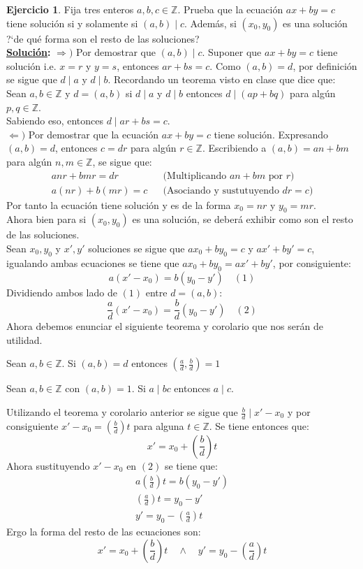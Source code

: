 \documentclass[11pt,letterpaper]{article}
\theoremstyle{definition}\newtheorem{p}{Ejercicio}
\theoremstyle{definition}\newtheorem{pp}[p]{$(*)$Ejercicio}
\numberwithin{p}{section}
\newcommand{\Z}{\mathbb{Z}}
\newcommand{\sol}{\textbf{\underline{Solución}: }} %
\begin{document}
\begin{p}
  Fija tres enteros $a,b,c\in\Z$. Prueba que la ecuaci\'on $ax+by=c$ tiene soluci\'on si y solamente si $(a,b)\mid c$.
  Adem\'as, si $(x_0,y_0)$ es una soluci\'on ?`de qu\'e forma son el resto de las soluciones?\\
  \sol $\Rightarrow )$ Por demostrar que $(a,b)\mid c$. Suponer que $ax+by=c$ tiene solución 
  i.e. $x=r$ y $y=s$, entonces $ar+bs=c$. Como $(a,b)=d$, por definición se sigue que $d \mid a$ y
  $d \mid b$. Recordando un teorema visto en clase que dice que:\\
  Sean $a,b \in \Z$ y $d=(a,b)$ si $d \mid a$ y $d \mid b$ entonces $d \mid (ap + bq)$ para algún
  $p,q \in \Z$.\\
  Sabiendo eso, entonces $d \mid ar + bs = c$.\\
  $\Leftarrow )$ Por demostrar que la ecuación $ax+by=c$ tiene solución. Expresando $(a,b)=d$, 
  entonces $c = dr$ para algún $r \in \Z$. Escribiendo a $(a,b)=an+bm$ para algún $n,m \in \Z$,
  se sigue que:
  \begin{align*}
  anr + bmr = dr && \text{(Multiplicando $an+bm$ por $r$)}\\
  a(nr) + b(mr) = c && \text{(Asociando y sustutuyendo $dr=c$)}
  \end{align*}
  Por tanto la ecuación tiene solución y es de la forma $x_0=nr$ y $y_0=mr$.\\
  Ahora bien para si $(x_0,y_0)$ es una solución, se deberá exhibir como son el resto de las 
  soluciones.\\
  Sean $x_0, y_0$ y $x', y'$ soluciones se sigue que $ax_0 + by_0 = c$ y $ax' + by' = c$, igualando
  ambas ecuaciones se tiene que $ax_0 + by_0 = ax' + by'$, por consiguiente:
  $$a(x' -x_0) = b(y_0 - y') \quad (1)$$
  Dividiendo ambos lado de $(1)$ entre $d=(a,b)$:
  $$\frac{a}{d}(x' -x_0) = \frac{b}{d}(y_0 - y') \quad (2)$$
  Ahora debemos enunciar el siguiente teorema y corolario que nos serán de utilidad.
  \begin{theorem}
  Sean $a,b \in \Z$. Si $(a,b)=d$ entonces $(\frac{a}{d}, \frac{b}{d})=1$
  \end{theorem}
  \begin{corollary}
  Sean $a,b \in \Z$ con $(a,b)=1$. Si $a \mid bc$ entonces $a \mid c$.
  \end{corollary}
  Utilizando el teorema y corolario anterior se sigue que $\frac{b}{d} \mid x' - x_0$ y por consiguiente 
  $x' - x_0 = (\frac{b}{d})t$ para alguna $t \in \Z$. Se tiene entonces que:
  $$x' = x_0 +(\frac{b}{d})t$$
  Ahora sustituyendo $x' - x_0$ en $(2)$ se tiene que:
  \begin{align*}
  a(\frac{b}{d})t = b(y_0 - y')\\
  (\frac{a}{d})t = y_0 - y'\\
  y' = y_0 - (\frac{a}{d})t
  \end{align*}
  Ergo la forma del resto de las ecuaciones son:
  $$x' = x_0 +(\frac{b}{d})t \quad \land \quad y' = y_0 - (\frac{a}{d})t$$
\end{p}
\end{document}
